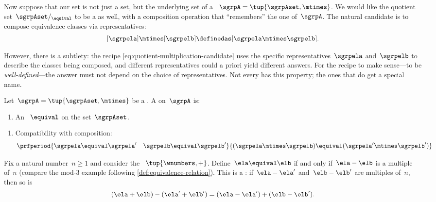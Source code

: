 Now suppose that our set is not just a set, but the underlying set of a ~$\sgrpA = \tup{\sgrpAset, \mtimes}$.
We would like the quotient set~$\sgrpAset/_{\equival}$ to be a  as well, with a composition operation that ``remembers'' the one of~$\sgrpA$.
The natural candidate is to compose equivalence classes via representatives:
\begin{equation}
    \label{eq:quotient-multiplication-candidate}
    [\sgrpela] \mtimes [\sgrpelb] \definedas [\sgrpela \mtimes \sgrpelb].
\end{equation}

However, there is a subtlety: the recipe \cref{eq:quotient-multiplication-candidate} uses the specific representatives~$\sgrpela$ and~$\sgrpelb$ to describe the classes being composed, and different representatives could a priori yield different answers.
For the recipe to make sense---to be \emph{well-defined}---the answer must not depend on the choice of representatives.
Not every  has this property; the ones that do get a special name.

\begin{ctdefinition}[Congruence]
    \label{def:congruence-semigroup}
    Let~$\sgrpA = \tup{\sgrpAset, \mtimes}$ be a .
    A  on~$\sgrpA$ is:

    \constit

    \begin{enumerate}
        \item An ~$\equival$ on the set~$\sgrpAset$.
    \end{enumerate}

    \condit

    \begin{enumerate}
        \item Compatibility with composition:
              \begin{equation}
                  \label{eq:congruence-compatibility}
                  \prfperiod{
                      \sgrpela \equival \sgrpela' \quad \sgrpelb \equival \sgrpelb'
                  }{
                      (\sgrpela \mtimes \sgrpelb) \equival (\sgrpela' \mtimes \sgrpelb')
                  }
              \end{equation}
    \end{enumerate}
\end{ctdefinition}

\begin{example}
    \label{exa:mod-n-congruence}
    Fix a natural number~$n \geq 1$ and consider the ~$\tup{\wnumbers, +}$.
    Define~$\ela \equival \elb$ if and only if~$\ela - \elb$ is a multiple of~$n$ (compare the mod-3 example following \cref{def:equivalence-relation}).
    This is a : if~$\ela - \ela'$ and~$\elb - \elb'$ are multiples of~$n$, then so is
    \begin{equation}
        (\ela + \elb) - (\ela' + \elb') = (\ela - \ela') + (\elb - \elb').
    \end{equation}
\end{example}

